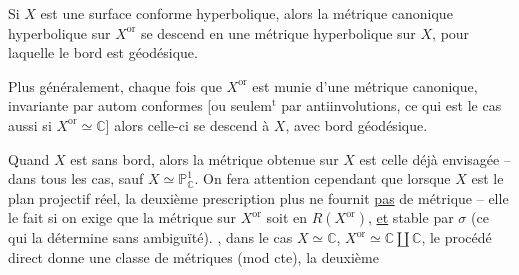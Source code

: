 
Si $X$ est une surface conforme hyperbolique, alors la métrique canonique hyperbolique sur $X^{\mathrm{or}}$ se descend en une métrique hyperbolique sur $X$, pour laquelle le bord est géodésique.

Plus généralement, chaque fois que $X^{\mathrm{or}}$ est munie d'une métrique canonique, invariante par autom conformes [ou seulem$^{\mathrm t}$ par antiinvolutions, ce qui est le cas aussi si $X^{\mathrm{or}}\simeq\mathbb C$] alors celle-ci se descend à $X$, avec bord géodésique.

Quand $X$ est sans bord,  alors  la métrique obtenue sur $X$ est celle déjà envisagée --  dans tous les cas, sauf $X\simeq\mathbb P^1_{\mathbb C}$. On fera attention cependant que lorsque $X$ est le plan projectif réel, la deuxième prescription  plus ne fournit \uline{pas} de métrique -- elle le fait si on exige que la métrique sur $X^{\mathrm{or}}$ soit en $R(X^{\mathrm{or}})$, \uline{et} stable par $\sigma$ (ce qui la détermine sans ambiguïté). , dans le cas $X\simeq\mathbb C$, $X^{\mathrm{or}}\simeq\mathbb C\amalg\mathbb C$, le procédé direct donne une classe de métriques (mod cte), la deuxième
